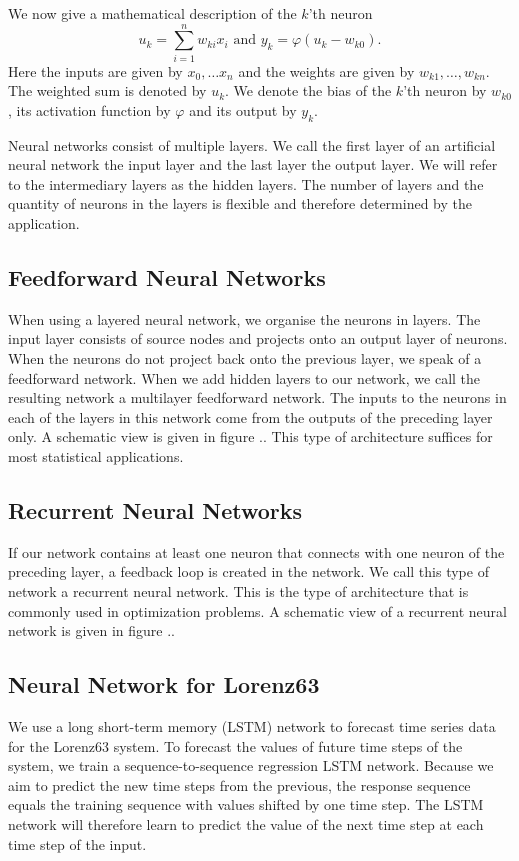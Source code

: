 \documentclass[english]{article}
\begin{document}
We now give a mathematical description of the $k$'th neuron
\[u_k = \sum_{i=1}^n w_{ki} x_i \text{ and } y_k = \varphi(u_k - w_{k0}).\]
Here the inputs are given by $x_0, \ldots x_n$ and the weights are given by $w_{k1},\ldots, w_{kn}$. The weighted sum is denoted by $u_k$. We denote the bias of the $k$'th neuron by $w_{k0}$, its activation function by $\varphi$ and its output by $y_k$.

Neural networks consist of multiple layers. We call the first layer of an artificial neural network the input layer and the last layer the output layer. We will refer to the intermediary layers as the hidden layers.  The number of layers and the quantity of neurons in the layers is flexible and therefore determined by the application.

\subsection{Feedforward Neural Networks}
When using a layered neural network, we organise the neurons in layers. The input layer consists of source nodes and projects onto an output layer of neurons. When the neurons do not project back onto the previous layer, we speak of a feedforward network. When we add hidden layers to our network, we call the resulting network a multilayer feedforward network. The inputs to the neurons in each of the layers in this network come from the outputs of the preceding layer only. A schematic view is given in figure .. This type of architecture suffices for most statistical applications.
\subsection{Recurrent Neural Networks}
If our network contains at least one neuron that connects with one neuron of the preceding layer, a feedback loop is created in the network. We call this type of network a recurrent neural network. This is the type of architecture that is commonly used in optimization problems. A schematic view of a recurrent neural network is given in figure ..

\subsection{Neural Network for Lorenz63}
We use a long short-term memory (LSTM) network to forecast time series data for the Lorenz63 system. To forecast the values of future time steps of the system, we train a sequence-to-sequence regression LSTM network. Because we aim to predict the new time steps from the previous, the response sequence equals the training sequence with values shifted by one time step. The LSTM network will therefore learn to predict the value of the next time step at each time step of the input.
\end{document}
